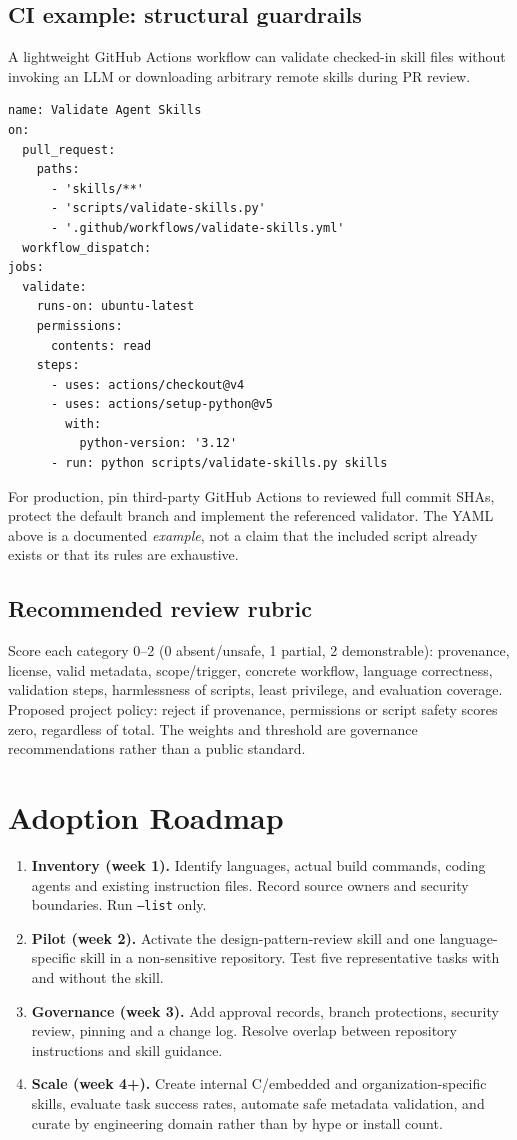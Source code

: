 \documentclass[11pt,letterpaper]{article}
\begin{document}
\subsection{CI example: structural guardrails}
A lightweight GitHub Actions workflow can validate checked-in skill files without invoking an LLM or downloading arbitrary remote skills during PR review.
\begin{verbatim}
name: Validate Agent Skills
on:
  pull_request:
    paths:
      - 'skills/**'
      - 'scripts/validate-skills.py'
      - '.github/workflows/validate-skills.yml'
  workflow_dispatch:
jobs:
  validate:
    runs-on: ubuntu-latest
    permissions:
      contents: read
    steps:
      - uses: actions/checkout@v4
      - uses: actions/setup-python@v5
        with:
          python-version: '3.12'
      - run: python scripts/validate-skills.py skills
\end{verbatim}
For production, pin third-party GitHub Actions to reviewed full commit SHAs, protect the default branch and implement the referenced validator. The YAML above is a documented \emph{example}, not a claim that the included script already exists or that its rules are exhaustive.

\subsection{Recommended review rubric}
Score each category 0--2 (0 absent/unsafe, 1 partial, 2 demonstrable): provenance, license, valid metadata, scope/trigger, concrete workflow, language correctness, validation steps, harmlessness of scripts, least privilege, and evaluation coverage. Proposed project policy: reject if provenance, permissions or script safety scores zero, regardless of total. The weights and threshold are governance recommendations rather than a public standard.

\section{Adoption Roadmap}
\begin{enumerate}[label=\textbf{Phase \arabic*:}]
\item \textbf{Inventory (week 1).} Identify languages, actual build commands, coding agents and existing instruction files. Record source owners and security boundaries. Run \texttt{--list} only.
\item \textbf{Pilot (week 2).} Activate the design-pattern-review skill and one language-specific skill in a non-sensitive repository. Test five representative tasks with and without the skill.
\item \textbf{Governance (week 3).} Add approval records, branch protections, security review, pinning and a change log. Resolve overlap between repository instructions and skill guidance.
\item \textbf{Scale (week 4+).} Create internal C/embedded and organization-specific skills, evaluate task success rates, automate safe metadata validation, and curate by engineering domain rather than by hype or install count.
\end{enumerate}
\end{document}
